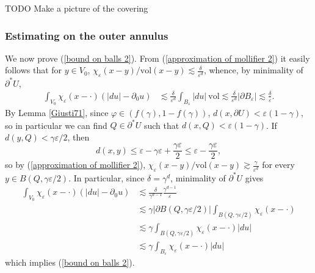 \documentclass[reqno,12pt,letterpaper]{amsart}
\newcommand{\vol}{\mathrm{vol}}
\theoremstyle{definition}
\numberwithin{equation}{section}
\begin{document}
TODO Make a picture of the covering

\subsubsection{Estimating on the outer annulus}
We now prove (\ref{bound on balls 2}).
From (\ref{approximation of mollifier 2}) it easily follows that for $y \in V_0$, $\chi_\varepsilon(x - y)/\vol(x - y) \lesssim \frac{\delta}{\varepsilon^d}$,
whence, by minimality of $\partial^* U$,
\begin{align*}
\int_{V_0} \chi_\varepsilon(x - \cdot)(|du| - \partial_0u) &\lesssim \frac{\delta}{\varepsilon^d} \int_{B_\varepsilon} |du| ~\vol \lesssim \frac{\delta}{\varepsilon^d} |\partial B_\varepsilon| \lesssim \frac{\delta}{\varepsilon}.
\end{align*}
By Lemma \ref{Giusti71}, since $\varphi \in (f(\gamma), 1 - f(\gamma))$, $d(x, \partial U) < \varepsilon(1 - \gamma)$, so in particular we can find $Q \in \partial^* U$ such that $d(x, Q) < \varepsilon(1 - \gamma)$.
If $d(y, Q) < \gamma\varepsilon/2$, then
$$d(x, y) \leq \varepsilon - \gamma\varepsilon + \frac{\gamma\varepsilon}{2} \leq \varepsilon - \frac{\gamma\varepsilon}{2},$$
so by (\ref{approximation of mollifier 2}), $\chi_\varepsilon(x - y)/\vol(x - y) \gtrsim \frac{\gamma}{\varepsilon^d}$
for every $y \in B(Q, \gamma\varepsilon/2)$.
In particular, since $\delta = \gamma^d$, minimality of $\partial^* U$ gives
\begin{align*}
\int_{V_0} \chi_\varepsilon(x - \cdot)(|du| - \partial_0u) &\lesssim \frac{\delta}{\gamma^{d - 1}} \frac{\gamma^{d - 1}}{\varepsilon}\\
&\lesssim \gamma |\partial B(Q, \gamma\varepsilon/2)| \int_{B(Q, \gamma\varepsilon/2)} \chi_\varepsilon(x - \cdot) \\
&\lesssim \gamma \int_{B(Q, \gamma\varepsilon/2)} \chi_\varepsilon(x - \cdot) |du|\\
&\lesssim \gamma \int_{B_\varepsilon} \chi_\varepsilon(x - \cdot) |du|
\end{align*}
which implies (\ref{bound on balls 2}).
\end{document}
